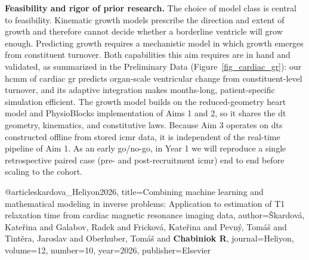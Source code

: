 \textbf{Feasibility and rigor of prior research.} The choice of model class is central to feasibility. Kinematic growth models\cite{rodriguez94,goktepe10} prescribe the direction and extent of growth and therefore cannot decide whether a borderline ventricle will grow enough. Predicting growth requires a mechanistic model in which growth emerges from constituent turnover\cite{humphrey02a,cyron16,braeu16}. Both capabilities this aim requires are in hand and validated, as summarized in the Preliminary Data (Figure~\ref{fig_cardiac_gr}): our \gls*{hcmm} of cardiac \gls*{gr} predicts organ-scale ventricular change from constituent-level turnover\cite{gebauer23}, and its adaptive integration makes months-long, patient-specific simulation efficient\cite{gebauer24}. The growth model builds on the reduced-geometry heart model and PhysioBlocks implementation of Aims 1 and 2\cite{caruel13}, so it shares the \gls*{dt} geometry, kinematics, and constitutive laws. Because Aim 3 operates on \glspl*{dt} constructed offline from stored \gls*{icmr} data, it is independent of the real-time pipeline of Aim 1. As an early go/no-go, in Year 1 we will reproduce a single retrospective paired case (pre- and post-recruitment \gls*{icmr}) end to end before scaling to the cohort.

@article{skardova_Heliyon2026,
  title={Combining machine learning and mathematical modeling in inverse problems: {A}pplication to estimation of {T}1 relaxation time from cardiac magnetic resonance imaging data},
  author={{\v{S}}kardov{\'a}, Kate{\v{r}}ina and Galabov, Radek and Frickov{\'a}, Kate{\v{r}}ina and Pevn{\'y}, Tom{\'a}{\v{s}} and Tint{\v{e}}ra, Jaroslav and Oberhuber, Tom{\'a}{\v{s}} and \textbf{Chabiniok R}},
  journal={Heliyon},
  volume={12},
  number={10},
  year={2026},
  publisher={Elsevier}
}
